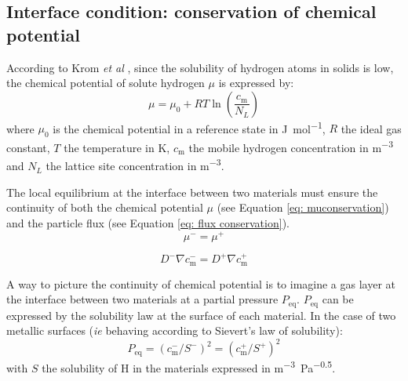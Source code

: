 \subsection{Interface condition: conservation of chemical potential}
According to Krom \textit{et al} , since the solubility of hydrogen atoms in solids is low, the chemical potential of solute hydrogen $\mu$ is expressed by:
\begin{equation}
    \mu = \mu_0 + RT \ln\left( \frac{c_\mathrm{m}}{N_L}\right)
\end{equation}
where $\mu_0$ is the chemical potential in a reference state in \si{J.mol^{-1}}, $R$ the ideal gas constant, $T$ the temperature in \si{K}, $c_\mathrm{m}$ the mobile hydrogen concentration in \si{m^{-3}} and $N_L$ the lattice site concentration in \si{m^{-3}}.



The local equilibrium at the interface between two materials must ensure  the continuity of both the chemical potential $\mu$ (see Equation \ref{eq: muconservation}) and the particle flux (see Equation \ref{eq: flux conservation}).
\begin{equation}
    \mu^- = \mu^+  \label{eq: muconservation}  
\end{equation}
    
\begin{equation}
    D^- \nabla c_\mathrm{m}^- = D^+ \nabla c_\mathrm{m}^+ \label{eq: flux conservation} 
\end{equation}

A way to picture the continuity of chemical potential is to imagine a gas layer at the interface between two materials at a partial pressure $P_\mathrm{eq}$.
$P_\mathrm{eq}$ can be expressed by the solubility law at the surface of each material.
In the case of two metallic surfaces (\textit{ie} behaving according to Sievert's law of solubility):
\begin{equation}
    P_\mathrm{eq} = (c_\mathrm{m}^-/S^-)^2 = (c_\mathrm{m}^+/S^+)^2
\end{equation}
with $S$ the solubility of H in the materials expressed in \si{m^{-3}.Pa^{-0.5}}.

